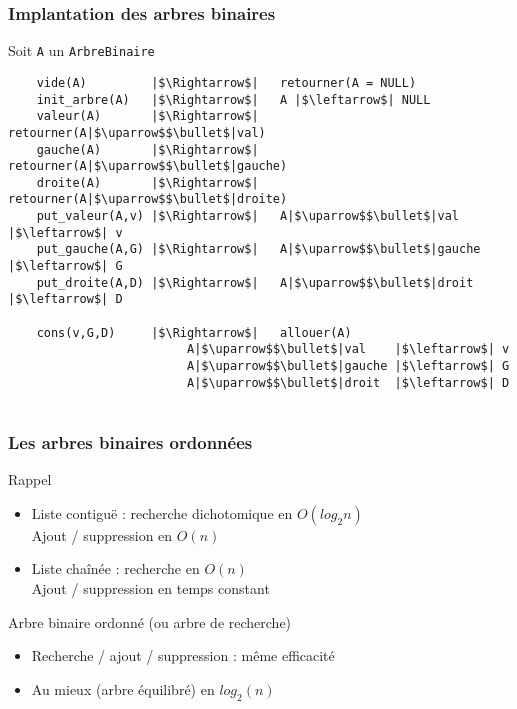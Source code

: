 \documentclass[table,handout,tikz,12pt,svgnames]{beamer}
\begin{document}
\begin{frame}[fragile=singleslide]
	\frametitle{Implantation des arbres binaires}
	\begin{block}{Soit \texttt{A} un \texttt{ArbreBinaire}}
		\begin{verbatim}
	vide(A)         |$\Rightarrow$|   retourner(A = NULL)
	init_arbre(A)   |$\Rightarrow$|   A |$\leftarrow$| NULL
	valeur(A)       |$\Rightarrow$|   retourner(A|$\uparrow$$\bullet$|val)
	gauche(A)       |$\Rightarrow$|   retourner(A|$\uparrow$$\bullet$|gauche)
	droite(A)       |$\Rightarrow$|   retourner(A|$\uparrow$$\bullet$|droite)
	put_valeur(A,v) |$\Rightarrow$|   A|$\uparrow$$\bullet$|val    |$\leftarrow$| v
	put_gauche(A,G) |$\Rightarrow$|   A|$\uparrow$$\bullet$|gauche |$\leftarrow$| G
	put_droite(A,D) |$\Rightarrow$|   A|$\uparrow$$\bullet$|droit  |$\leftarrow$| D

	cons(v,G,D)     |$\Rightarrow$|   allouer(A)
                         A|$\uparrow$$\bullet$|val    |$\leftarrow$| v
                         A|$\uparrow$$\bullet$|gauche |$\leftarrow$| G
                         A|$\uparrow$$\bullet$|droit  |$\leftarrow$| D


		\end{verbatim}
	\end{block}
\end{frame}


\begin{frame}[fragile=singleslide]
	\frametitle{Les arbres binaires ordonnées}
	\begin{block}{Rappel}
		\begin{itemize}
			\item Liste contiguë : recherche dichotomique en $O(log_2n)$\\
			Ajout / suppression en $O(n)$
			\item Liste chaînée : recherche en $O(n)$\\
			Ajout / suppression en temps constant
		\end{itemize}
	\end{block}
	\begin{block}{Arbre binaire ordonné (ou arbre de recherche)}
		\begin{itemize}
			\item Recherche / ajout / suppression : même efficacité
			\item Au mieux (arbre équilibré) en $log_2(n)$
		\end{itemize}
	\end{block}
\end{frame}
\end{document}
